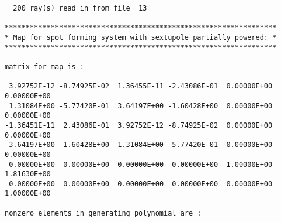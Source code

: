 \begin{footnotesize}
\begin{verbatim}
  200 ray(s) read in from file  13

*****************************************************************
* Map for spot forming system with sextupole partially powered: *
*****************************************************************

matrix for map is :

 3.92752E-12 -8.74925E-02  1.36455E-11 -2.43086E-01  0.00000E+00  0.00000E+00
 1.31084E+00 -5.77420E-01  3.64197E+00 -1.60428E+00  0.00000E+00  0.00000E+00
-1.36451E-11  2.43086E-01  3.92752E-12 -8.74925E-02  0.00000E+00  0.00000E+00
-3.64197E+00  1.60428E+00  1.31084E+00 -5.77420E-01  0.00000E+00  0.00000E+00
 0.00000E+00  0.00000E+00  0.00000E+00  0.00000E+00  1.00000E+00  1.81630E+00
 0.00000E+00  0.00000E+00  0.00000E+00  0.00000E+00  0.00000E+00  1.00000E+00

nonzero elements in generating polynomial are :


\end{verbatim}
\end{footnotesize}
